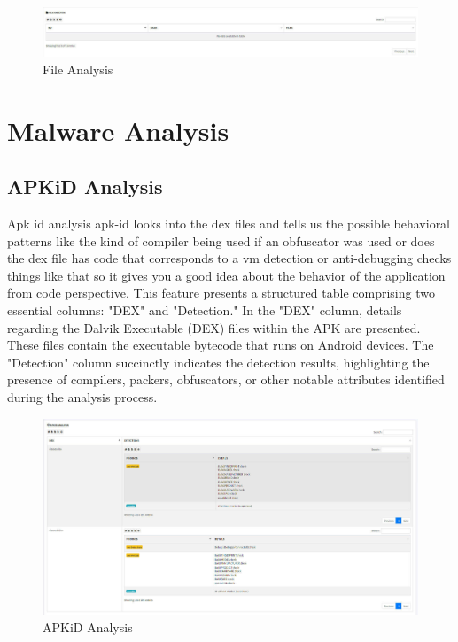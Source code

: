 \documentclass{report}
\begin{document}
\begin{figure}[hbt!]
    \centering
    \includegraphics[width=1\textwidth]{images/fileanalysis.jpg}
    \caption{File Analysis}
    \label{fig:example}
\end{figure}
\FloatBarrier


\section{Malware Analysis}
\subsection*{APKiD Analysis}
Apk id analysis apk-id looks into the dex files and
tells us the possible behavioral patterns like the kind of compiler being used if
an obfuscator was used or does the dex file has code that corresponds to a vm detection or anti-debugging checks things like that so it gives you a good idea about the behavior of the application from code perspective. This feature presents a structured table comprising two essential columns: "DEX" and "Detection."
In the "DEX" column, details regarding the Dalvik Executable (DEX) files within the APK are presented. These files contain the executable bytecode that runs on Android devices. The "Detection" column succinctly indicates the detection results, highlighting the presence of compilers, packers, obfuscators, or other notable attributes identified during the analysis process.

\begin{figure}[hbt!]
    \centering
    \includegraphics[width=1\textwidth]{images/apkid.jpg}
    \caption{APKiD Analysis}
    \label{fig:example}
\end{figure}
\FloatBarrier
\end{document}
